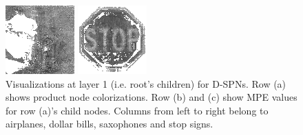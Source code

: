 \documentclass{article}
\begin{document}
\begin{figure}[t]
\begin{minipage}[c]{.21\linewidth}
  \end{minipage}
  \begin{minipage}[c]{.21\linewidth}
    \centering\centerline{\includegraphics[width=\linewidth]{imgs/dennis_cal/saxophone/sums/0_1.png}}
  \end{minipage}
  \begin{minipage}[c]{.21\linewidth}
    \centering\centerline{\includegraphics[width=\linewidth]{imgs/dennis_cal/stop/sums/0_1.png}}
  \end{minipage}
  \caption{Visualizations at layer 1 (i.e. root's children) for D-SPNs. Row (a) shows product node
    colorizations. Row (b) and (c) show MPE values for row (a)'s child nodes. Columns from left to
  right belong to airplanes, dollar bills, saxophones and stop signs.\label{fig:d-cal-0}}
\end{figure}
\end{document}
